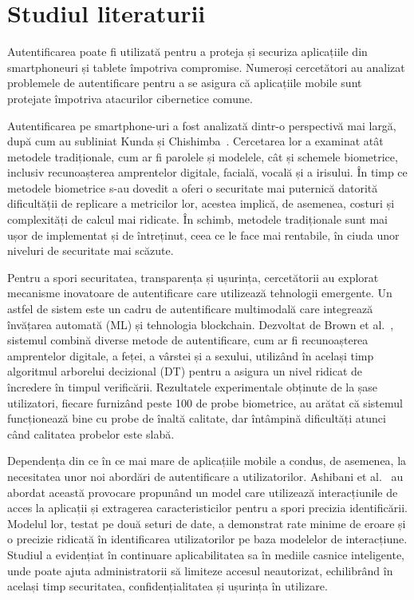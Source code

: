 \documentclass[runningheads]{llncs}
\begin{document}
\section{Studiul literaturii}
Autentificarea poate fi utilizată pentru a proteja și securiza aplicațiile din smartphoneuri și tablete împotriva compromise. Numeroși cercetători au analizat problemele de autentificare pentru a se asigura că aplicațiile mobile sunt protejate împotriva atacurilor cibernetice comune.

Autentificarea pe smartphone-uri a fost analizată dintr-o perspectivă mai largă, după cum au subliniat Kunda și Chishimba~\cite{kunda2021}. Cercetarea lor a examinat atât metodele tradiționale, cum ar fi parolele și modelele, cât și schemele biometrice, inclusiv recunoașterea amprentelor digitale, facială, vocală și a irisului. În timp ce metodele biometrice s-au dovedit a oferi o securitate mai puternică datorită dificultății de replicare a metricilor lor, acestea implică, de asemenea, costuri și complexități de calcul mai ridicate. În schimb, metodele tradiționale sunt mai ușor de implementat și de întreținut, ceea ce le face mai rentabile, în ciuda unor niveluri de securitate mai scăzute.

Pentru a spori securitatea, transparența și ușurința, cercetătorii au explorat mecanisme inovatoare de autentificare care utilizează tehnologii emergente. Un astfel de sistem este un cadru de autentificare multimodală care integrează învățarea automată (ML) și tehnologia blockchain. Dezvoltat de Brown et al.~\cite{brown2021}, sistemul combină diverse metode de autentificare, cum ar fi recunoașterea amprentelor digitale, a feței, a vârstei și a sexului, utilizând în același timp algoritmul arborelui decizional (DT) pentru a asigura un nivel ridicat de încredere în timpul verificării. Rezultatele experimentale obținute de la șase utilizatori, fiecare furnizând peste 100 de probe biometrice, au arătat că sistemul funcționează bine cu probe de înaltă calitate, dar întâmpină dificultăți atunci când calitatea probelor este slabă.

Dependența din ce în ce mai mare de aplicațiile mobile a condus, de asemenea, la necesitatea unor noi abordări de autentificare a utilizatorilor. Ashibani et al.~\cite{ashibani2020} au abordat această provocare propunând un model care utilizează interacțiunile de acces la aplicații și extragerea caracteristicilor pentru a spori precizia identificării. Modelul lor, testat pe două seturi de date, a demonstrat rate minime de eroare și o precizie ridicată în identificarea utilizatorilor pe baza modelelor de interacțiune. Studiul a evidențiat în continuare aplicabilitatea sa în mediile casnice inteligente, unde poate ajuta administratorii să limiteze accesul neautorizat, echilibrând în același timp securitatea, confidențialitatea și ușurința în utilizare.
\end{document}
